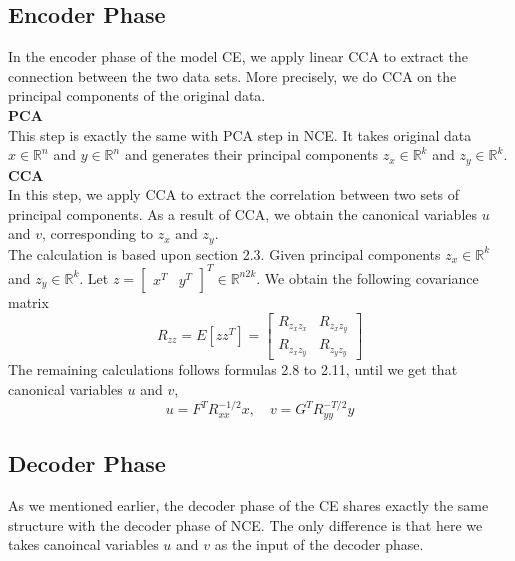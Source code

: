 \documentclass[12pt]{report} %
\begin{document}
\subsection{Encoder Phase}
In the encoder phase of the model CE, we apply linear CCA to extract the connection between the two data sets. More precisely, we do CCA on the principal components of the original data.\\ 

\textbf{PCA}\\
This step is exactly the same with PCA step in NCE. It takes original data $x\in \mathbb{R}^{n}$ and $y\in \mathbb{R}^{n}$ and generates their principal components $z_x\in \mathbb{R}^{k}$ and $z_y\in \mathbb{R}^{k}$.\\

\textbf{CCA}\\
In this step, we apply CCA to extract the correlation between two sets of principal components. As a result of CCA, we obtain the canonical variables $u$ and $v$, corresponding to $z_x$ and $z_y$. \\
The calculation is based upon section 2.3. Given principal components $z_x\in \mathbb{R}^{k}$ and $z_y\in \mathbb{R}^{k}$. Let $z= \begin{bmatrix}x^T & y^T\end{bmatrix}^T \in \mathbb{R}^{n2k}$. We obtain the following covariance matrix
\begin{equation}
R_{zz}=E[zz^T]=\begin{bmatrix}
R_{z_{x}z_{x}} & R_{z_{x}z_{y}} \\
R_{z_{x}z_{y}} & R_{z_{y}z_{y}}
\end{bmatrix}
\end{equation}
The remaining calculations follows formulas 2.8 to 2.11, until we get that canonical variables $u$ and $v$,
\begin{equation}
u=F^TR_{xx}^{-1/2}x,\quad v=G^TR_{yy}^{-T/2}y
\end{equation}

\subsection{Decoder Phase}
As we mentioned earlier, the decoder phase of the CE shares exactly the same structure with the decoder phase of NCE. The only difference is that here we takes canoincal variables $u$ and $v$ as the input of the decoder phase. 
\end{document}
